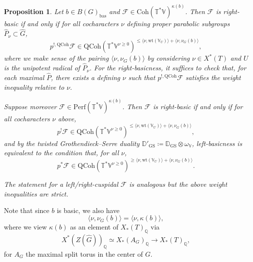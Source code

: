 \documentclass{amsart}
\newtheorem{proposition}[theorem]{Proposition}
\theoremstyle{definition}
\theoremstyle{remark}
\numberwithin{equation}{section}
\newcommand{\mc}{\mathcal}
\newcommand{\Q}{\mathbb{Q}}
\newcommand{\bas}{\mathrm{bas}}
\newcommand{\wh}{\widehat}
\newcommand{\D}{\mathbb{D}}
\newcommand{\QCoh}{\mathrm{QCoh}}
\newcommand{\Coh}{\mathrm{Coh}}
\newcommand{\GS}{\mathrm{GS}}
\newcommand{\V}{\mathbb{V}}
\newcommand{\T}{\mathbb{T}}
\newcommand{\Perf}{\mathrm{Perf}}
\newcommand{\wt}{\mathrm{wt}}
\begin{document}
\begin{proposition}{\label{prop: basicweightcharacterization}}
Let $b \in B(G)_{\bas}$ and $\mc F \in \Coh(\T^*\V)^{\kappa (b)}$. Then $\mc{F}$ is right-basic if and only if for all cocharacters $\nu$ defining proper parabolic subgroups $\wh P_{\nu} \subset \wh G$, 
\[
p^{!,\QCoh} \mc F \in \QCoh(\T^* \V^{\nu\geq 0})^{\leq \langle \nu, \wt(\V_{ U}) \rangle + \langle \nu, \nu_G(b)\rangle}, 
\]
where we make sense of the pairing $\langle \nu, \nu_G(b) \rangle$ by considering $\nu \in X^{\ast}(T)$ and $U$ is the unipotent radical of $\wh{P}_{\nu}$. For the right-basicness, it suffices to check that, for each maximal $\wh{P}$, there exists a defining $\nu$ such that $p^{!,\QCoh}\mc{F}$ satisfies the weight inequality relative to $\nu$.

Suppose moreover $\mc F \in \Perf(\T^*\V)^{\kappa (b)}$. Then $\mc{F}$ is right-basic if and only if for all cocharacters $\nu$ above, 
\[
p^! \mc F \in \QCoh(\T^* \V^{\nu\geq 0})^{\leq \langle \nu, \wt(\V_{ U}) \rangle + \langle \nu, \nu_G(b)\rangle},
\]
and by the twisted Grothendieck--Serre duality $\D'_{\GS}\coloneq \D_\GS\otimes \omega_{\V}$, left-basicness is equivalent to the condition that, for all $\nu$,
\[
p^* \mc F \in \QCoh(\T^{\ast} \V^{\nu\geq 0})^{\geq \langle \nu, \wt(\V_{U})\rangle+ \langle \nu, \nu_G(b)\rangle}. 
\]

The statement for a left/right-cuspidal $\mc{F}$ is analogous but the above weight inequalities are strict. 
\end{proposition}
Note that since $b$ is basic, we also have
\begin{equation*}
    \langle \nu, \nu_G(b) \rangle = \langle \nu, \kappa(b) \rangle,
\end{equation*}
where we view $\kappa(b)$ as an element of $X_{\ast}(T)_{\Q}$ via
\begin{equation*}
    X^{\ast}(Z(\wh{G}))_{\Q} \simeq X_{\ast}(A_G)_{\Q} \rightarrow X_{\ast}(T)_{\Q},
\end{equation*}
for $A_G$ the maximal split torus in the center of $G$.
\end{document}
